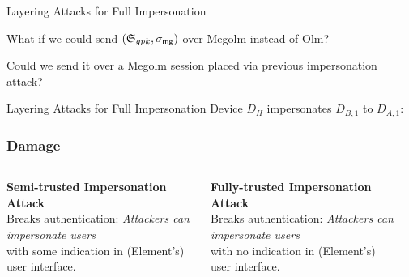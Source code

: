 \documentclass[aspectratio=169]{beamer}
\begin{document}
\begin{frame}{Layering Attacks for Full Impersonation}
\begin{center}
{
  }
  \end{center}

  What if we could send $(\MegolmIS, \MegolmSignature)$ over Megolm instead of Olm?

  Could we send it over a Megolm session placed via previous impersonation attack?

\end{frame}

\begin{frame}{Layering Attacks for Full Impersonation}
  Device $D_{H}$ impersonates $D_{B,1}$ to $D_{A,1}$:

  \centering\scalebox{0.75}{}

\end{frame}

\begin{frame}
  \frametitle{Damage}
  \begin{columns}
  \begin{column}{0.3\columnwidth}
    \textbf{Semi-trusted Impersonation Attack}\\
    \vspace{1em}
    Breaks authentication: \emph{Attackers can impersonate users} \\
    \vspace{1em}
    with some indication in (Element's) user interface.
  \end{column}
  \begin{column}{0.3\columnwidth}
    \textbf{Fully-trusted Impersonation Attack}\\
    \vspace{1em}
    Breaks authentication: \emph{Attackers can impersonate users} \\
    \vspace{1em}
    with \alert{no indication} in (Element's) user interface.
  \end{column}
  \begin{column}{0.3\columnwidth}
  \end{column}
  \end{columns}
\end{frame}
\end{document}

